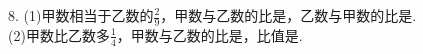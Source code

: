 8. (1)甲数相当于乙数的$\frac{2}{9}$，甲数与乙数的比是\key{\qquad}，乙数与甲数的比是\key{\qquad}. \\

\hspace*{4mm}(2)甲数比乙数多$\frac{1}{4}$，甲数与乙数的比是\key{\qquad}，比值是\key{\qquad}. \\






